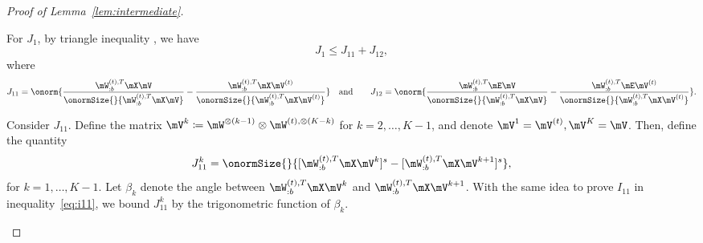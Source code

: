 \documentclass[lettersize,onecolumn,journal]{IEEEtran}
\theoremstyle{definition}
\theoremstyle{definition}
\def\fixme#1#2{\textbf{\color{red}[FIXME (#1): #2]}}
\begin{document}
\begin{proof}[Proof of Lemma~\ref{lem:intermediate}]
\begin{enumerate}
    For $J_1$, by triangle inequality 
    , we have 
    \begin{equation}
        J_1 \leq J_{11} + J_{12},
    \end{equation}
    where 
    \begin{equation}
        J_{11} =  \onorm{ \frac{\mW_{:b}^{(t),T} \mX \mV }{\onormSize{}{ \mW_{:b}^{(t),T} \mX \mV }} - \frac{\mW_{:b}^{(t),T} \mX \mV^{(t)} }{\onormSize{}{ \mW_{:b}^{(t),T} \mX \mV^{(t)} }}  } \quad \text{and} \quad \quad J_{12} =  \onorm{ \frac{\mW_{:b}^{(t),T}  \mE \mV}{ \onormSize{}{\mW_{:b}^{(t),T}  \mX \mV} } - \frac{\mW_{:b}^{(t),T}  \mE \mV^{(t)}}{ \onormSize{}{\mW_{:b}^{(t),T}  \mX \mV^{(t)}} }   }.
    \end{equation}
    
    
    Consider $J_{11}$.  Define the matrix $\mV^{k} \coloneqq \mW^{\otimes (k-1)} \otimes \mW^{(t), \otimes (K-k)}$ for $k = 2,\ldots, K-1$, and denote $\mV^1 = \mV^{(t)}, \mV^K = \mV$. Then, define the quantity
    \begin{equation}
        J_{11}^k = \onormSize{}{ [\mW_{:b}^{(t),T} \mX \mV^k ]^s - [\mW_{:b}^{(t),T} \mX \mV^{k+1} ]^s },
     \end{equation}
    for $k = 1,\ldots, K-1$. Let $\beta_k$ denote the angle between $\mW_{:b}^{(t),T} \mX \mV^k$ and $\mW_{:b}^{(t),T} \mX \mV^{k+1}$. With the same idea to prove $I_{11}$ in inequality~\eqref{eq:i11}, we bound $J_{11}^k$ by the trigonometric function of $\beta_k$. 
    

\end{enumerate}
\end{proof}
\end{document}
